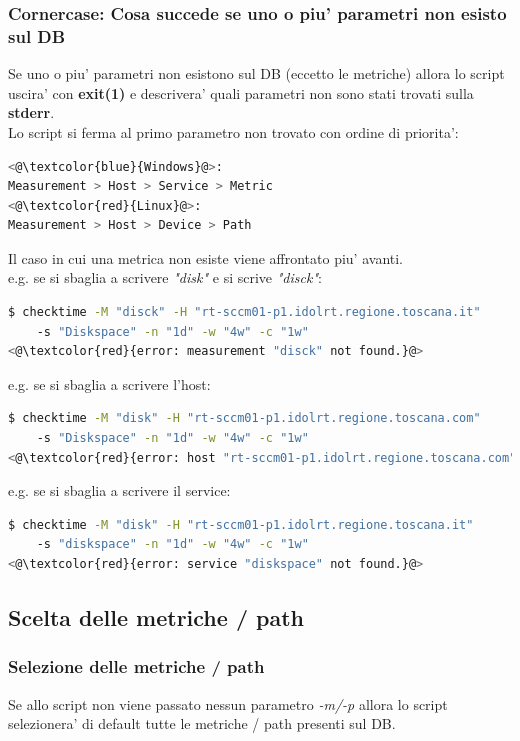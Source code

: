 \documentclass{article}
\begin{document}
\subsubsection*{Cornercase: Cosa succede se uno o piu' parametri non esisto sul DB}
Se uno o piu' parametri non esistono sul DB (eccetto le metriche) allora lo script uscira' con \textbf{exit(1)} e descrivera' quali parametri non sono stati trovati sulla \textbf{stderr}.
\\
Lo script si ferma al primo parametro non trovato con ordine di priorita':
\begin{lstlisting}[language=Bash]
<@\textcolor{blue}{Windows}@>:
Measurement > Host > Service > Metric
<@\textcolor{red}{Linux}@>:
Measurement > Host > Device > Path
\end{lstlisting}
Il caso in cui una metrica non esiste viene affrontato piu' avanti.\\
e.g. se si sbaglia a scrivere \textit{"disk"} e si scrive \textit{"disck"}:
\begin{lstlisting}[language=Bash]
$ checktime -M "disck" -H "rt-sccm01-p1.idolrt.regione.toscana.it" 
    -s "Diskspace" -n "1d" -w "4w" -c "1w"
<@\textcolor{red}{error: measurement "disck" not found.}@>
\end{lstlisting}

e.g. se si sbaglia a scrivere l'host:
\begin{lstlisting}[language=Bash]
$ checktime -M "disk" -H "rt-sccm01-p1.idolrt.regione.toscana.com" 
    -s "Diskspace" -n "1d" -w "4w" -c "1w"
<@\textcolor{red}{error: host "rt-sccm01-p1.idolrt.regione.toscana.com" not found.}@>
\end{lstlisting}

e.g. se si sbaglia a scrivere il service:
\begin{lstlisting}[language=Bash]
$ checktime -M "disk" -H "rt-sccm01-p1.idolrt.regione.toscana.it" 
    -s "diskspace" -n "1d" -w "4w" -c "1w"
<@\textcolor{red}{error: service "diskspace" not found.}@>
\end{lstlisting}

\clearpage
\subsection*{Scelta delle metriche / path}
\subsubsection*{Selezione delle metriche / path}
Se allo script non viene passato nessun parametro \textit{-m/-p} allora lo script selezionera' di default tutte le metriche / path presenti sul DB.
\end{document}
